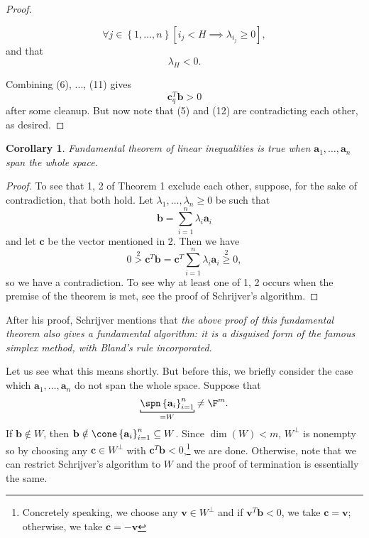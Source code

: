 \documentclass{article}
\newtheorem{cor}[theorem]{Corollary}
\renewcommand{\underbrace}{\underbracket[0.25mm][0.7mm]}
\renewcommand{\vec}{\mathbf}
\begin{document}
\begin{proof}
\begin{enumerate}
            \begin{equation}
                \forall j\in\left\lbrace 1,\ldots,n \right\rbrace \left[ i_j < H \implies \lambda_{i_j}\geq 0 \right] ,
            \end{equation}
            and that
            \begin{equation}
                \lambda_H < 0.
            \end{equation}
    \end{enumerate}
    Combining (6), ..., (11) gives
    \begin{equation}
        \vec{c}_q^{T} \vec{b} > 0
    \end{equation}
    after some cleanup. But now note that (5) and (12) are contradicting each other, as desired.
\end{proof}

\begin{cor}
    Fundamental theorem of linear inequalities is true when $\vec{a}_1,\ldots,\vec{a}_n$ span the whole space.
\end{cor}	

\begin{proof}
    To see that 1, 2 of Theorem 1 exclude each other, suppose, for the sake of contradiction, that both hold. Let $\lambda_1,\ldots,\lambda_n\geq 0$ be such that
    \begin{equation*}
        \vec{b} = \sum^{n}_{i=1} \lambda_i\vec{a}_i
    \end{equation*}
    and let $\vec{c}$ be the vector mentioned in 2. Then we have
    \begin{equation*}
        0 \overset{2}{>} \vec{c}^{T} \vec{b} = \vec{c}^{T} \sum^{n}_{i=1} \lambda_i\vec{a}_i \overset{2}{\geq} 0,
    \end{equation*}
    so we have a contradiction. To see why at least one of 1, 2 occurs when the premise of the theorem is met, see the proof of Schrijver's algorithm.
\end{proof}

After his proof, Schrijver mentions that \cite{TLIP} \textit{the above proof of this fundamental theorem also gives a fundamental algorithm: it is a disguised form of the famous simplex method, with Bland's rule incorporated}.

Let us see what this means shortly. But before this, we briefly consider the case which $\vec{a}_1,\ldots,\vec{a}_n$ do not span the whole space. Suppose that
\begin{equation*}
    \underbrace{\spn\left\lbrace \vec{a}_i \right\rbrace ^n_{i=1}}_{=W}\neq\F^m.
\end{equation*}
If $\vec{b}\notin W$, then $\vec{b}\notin\cone\left\lbrace \vec{a}_{i} \right\rbrace^{n}_{i=1}\subseteq W$. Since $\dim\left( W \right) < m$, $W^{\perp}$ is nonempty so by choosing any $\vec{c}\in W^{\perp}$ with $\vec{c}^{T} \vec{b}<0$,\footnote{Concretely speaking, we choose any $\vec{v}\in W^\perp$ and if $\vec{v}^{T} \vec{b}<0$, we take $\vec{c}=\vec{v}$; otherwise, we take $\vec{c}=-\vec{v}$} we are done. Otherwise, note that we can restrict Schrijver's algorithm to $W$ and the proof of termination is essentially the same.
\end{document}
